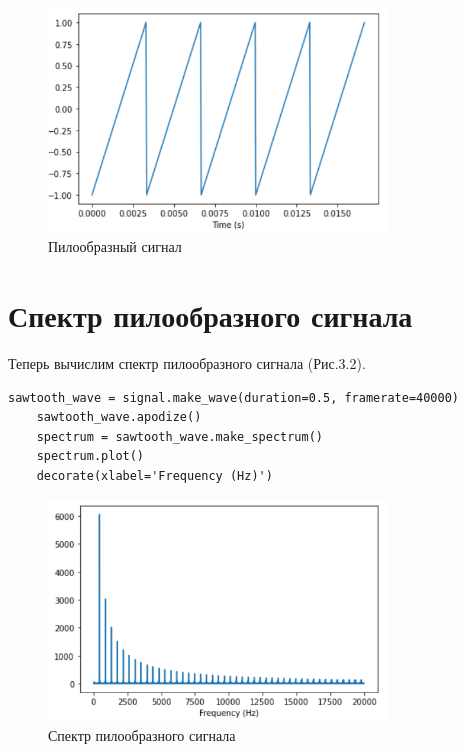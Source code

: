 \documentclass[a4paper,12pt]{report}
\begin{document}
\begin{figure}[H]
        \centering
        \includegraphics[width=0.8\textwidth]{fig3-1.PNG}
        \caption{Пилообразный сигнал}
        \label{fig:fig3-1}
\end{figure}    

\section{Спектр пилообразного сигнала} 
    Теперь вычислим спектр пилообразного сигнала (Рис.3.2).  
\begin{lstlisting}[caption=Вычисление спектра пилообразного сигнала]
    sawtooth_wave = signal.make_wave(duration=0.5, framerate=40000)
    sawtooth_wave.apodize()
    spectrum = sawtooth_wave.make_spectrum()
    spectrum.plot()
    decorate(xlabel='Frequency (Hz)')
\end{lstlisting}

\begin{figure}[H]
        \centering
        \includegraphics[width=0.8\textwidth]{fig3-2.PNG}
        \caption{Спектр пилообразного сигнала}
        \label{fig:fig3-2}
\end{figure} 
\end{document}
